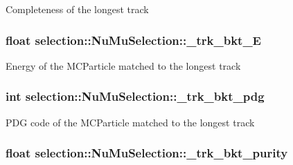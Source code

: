 Completeness of the longest track \hypertarget{classselection_1_1NuMuSelection_a1957763f4a43de544b42a9e04cf83afa}{
\subsubsection[{\-\_\-trk\-\_\-bkt\-\_\-\-E}]{\setlength{\rightskip}{0pt plus 5cm}float selection\-::\-Nu\-Mu\-Selection\-::\-\_\-trk\-\_\-bkt\-\_\-\-E\hspace{0.3cm}{\ttfamily [private]}}}\label{classselection_1_1NuMuSelection_a1957763f4a43de544b42a9e04cf83afa}
Energy of the M\-C\-Particle matched to the longest track \hypertarget{classselection_1_1NuMuSelection_afc6475990e683ff735846740580cac9b}{
\subsubsection[{\-\_\-trk\-\_\-bkt\-\_\-pdg}]{\setlength{\rightskip}{0pt plus 5cm}int selection\-::\-Nu\-Mu\-Selection\-::\-\_\-trk\-\_\-bkt\-\_\-pdg\hspace{0.3cm}{\ttfamily [private]}}}\label{classselection_1_1NuMuSelection_afc6475990e683ff735846740580cac9b}
P\-D\-G code of the M\-C\-Particle matched to the longest track \hypertarget{classselection_1_1NuMuSelection_a72c22e0de99d58873fa4e9824e094c50}{
\subsubsection[{\-\_\-trk\-\_\-bkt\-\_\-purity}]{\setlength{\rightskip}{0pt plus 5cm}float selection\-::\-Nu\-Mu\-Selection\-::\-\_\-trk\-\_\-bkt\-\_\-purity\hspace{0.3cm}{\ttfamily [private]}}}\label{classselection_1_1NuMuSelection_a72c22e0de99d58873fa4e9824e094c50}
